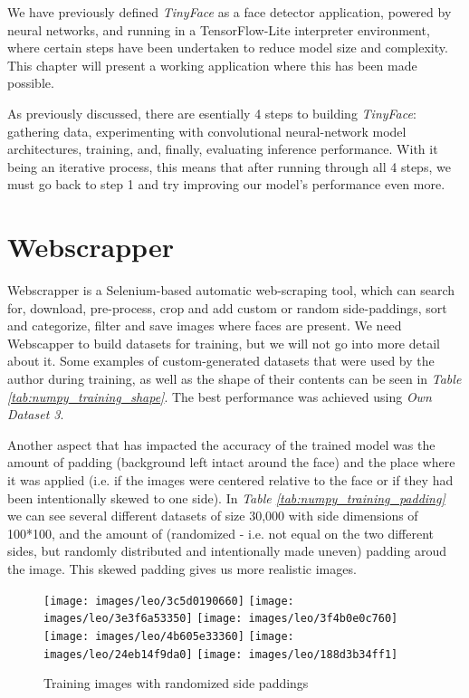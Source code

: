 We have previously defined \textit{TinyFace} as a face detector application, powered by neural networks, and running in a TensorFlow-Lite interpreter environment, where certain steps have been undertaken to reduce model size and complexity. This chapter will present a working application where this has been made possible. \par
As previously discussed, there are esentially 4 steps to building \textit{TinyFace}: gathering data, experimenting with convolutional neural-network model architectures, training, and, finally, evaluating inference performance. With it being an iterative process, this means that after running through all 4 steps, we must go back to step 1 and try improving our model's performance even more. \par

\section{Webscrapper}

Webscrapper is a Selenium-based automatic web-scraping tool, which can search for, download, pre-process, crop and add custom or random side-paddings, sort and categorize, filter and save images where faces are present. We need Webscapper to build datasets for training, but we will not go into more detail about it. Some examples of custom-generated datasets that were used by the author during training, as well as the shape of their contents can be seen in \textit{Table \ref{tab:numpy_training_shape}}. The best performance was achieved using \textit{Own Dataset 3}. \par
Another aspect that has impacted the accuracy of the trained model was the amount of padding (background left intact around the face) and the place where it was applied (i.e. if the images were centered relative to the face or if they had been intentionally skewed to one side). In \textit{Table \ref{tab:numpy_training_padding}} we can see several different datasets of size 30,000 with side dimensions of 100*100, and the amount of (randomized - i.e. not equal on the two different sides, but randomly distributed and intentionally made uneven) padding aroud the image. This skewed padding gives us more realistic images.
\begin{figure*}[ht!]
    \texttt{[image: images/leo/3c5d0190660]}\hfill
    \texttt{[image: images/leo/3e3f6a53350]}\hfill
    \texttt{[image: images/leo/3f4b0e0c760]}\hfill
    \texttt{[image: images/leo/4b605e33360]}\hfill
    \texttt{[image: images/leo/24eb14f9da0]}\hfill
    \texttt{[image: images/leo/188d3b34ff1]}\hfill
    \caption{Training images with randomized side paddings}
\end{figure*}

